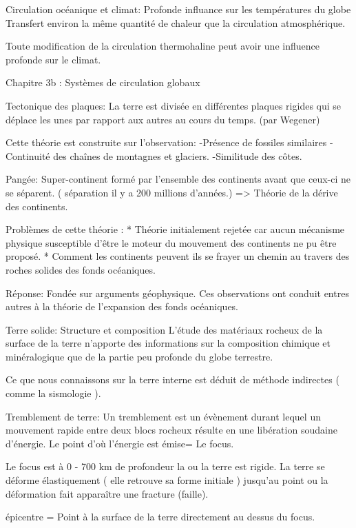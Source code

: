 Circulation océanique et climat:
Profonde influance sur les températures du globe
Transfert environ la même quantité de chaleur que la circulation atmosphérique.


Toute modification de la circulation thermohaline peut avoir une influence profonde sur le climat.




Chapitre 3b : Systèmes de circulation globaux


Tectonique des plaques: La terre est divisée en différentes plaques rigides qui se déplace les unes par rapport aux autres au cours du temps. (par Wegener)


Cette théorie est construite sur l’observation:
-Présence de fossiles similaires
-Continuité des chaînes de montagnes et glaciers.
-Similitude des côtes.


Pangée: Super-continent formé par l’ensemble des continents avant que ceux-ci ne se séparent. ( séparation il y a 200 millions d’années.) => Théorie de la dérive des continents.


Problèmes de cette théorie : 
* Théorie initialement rejetée car aucun mécanisme physique susceptible d’être le moteur du mouvement des continents ne pu être proposé.
* Comment les continents peuvent ils se frayer un chemin au travers des roches solides des fonds océaniques.


Réponse: Fondée sur arguments géophysique. Ces observations ont conduit entres autres à la théorie de l’expansion des fonds océaniques.




Terre solide: Structure et composition
L’étude des matériaux rocheux de la surface de la terre n’apporte des informations sur la composition chimique et minéralogique que de la partie peu profonde du globe terrestre.


Ce que nous connaissons sur la terre interne est déduit de méthode indirectes ( comme la sismologie ).


Tremblement de terre:
Un tremblement est un évènement durant lequel un mouvement rapide entre deux blocs rocheux résulte en une libération soudaine d’énergie.
Le point d’où l’énergie est émise= Le focus.


Le focus est à 0 - 700 km de profondeur la ou la terre est rigide.
La terre se déforme élastiquement ( elle retrouve sa forme initiale ) jusqu’au point ou la déformation fait apparaître une fracture (faille).


épicentre = Point à la surface de la terre directement au dessus du focus.


